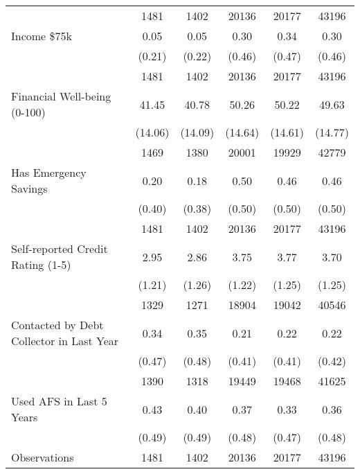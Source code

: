 {\begin{tabular}{l*{5}{c}}
                    &        1481&        1402&       20136&       20177&       43196\\
Income \>\$75k       &        0.05&        0.05&        0.30&        0.34&        0.30\\
                    &      (0.21)&      (0.22)&      (0.46)&      (0.47)&      (0.46)\\
                    &        1481&        1402&       20136&       20177&       43196\\
Financial Well-being (0-100)&       41.45&       40.78&       50.26&       50.22&       49.63\\
                    &     (14.06)&     (14.09)&     (14.64)&     (14.61)&     (14.77)\\
                    &        1469&        1380&       20001&       19929&       42779\\
Has Emergency Savings&        0.20&        0.18&        0.50&        0.46&        0.46\\
                    &      (0.40)&      (0.38)&      (0.50)&      (0.50)&      (0.50)\\
                    &        1481&        1402&       20136&       20177&       43196\\
Self-reported Credit Rating (1-5)&        2.95&        2.86&        3.75&        3.77&        3.70\\
                    &      (1.21)&      (1.26)&      (1.22)&      (1.25)&      (1.25)\\
                    &        1329&        1271&       18904&       19042&       40546\\
Contacted by Debt Collector in Last Year&        0.34&        0.35&        0.21&        0.22&        0.22\\
                    &      (0.47)&      (0.48)&      (0.41)&      (0.41)&      (0.42)\\
                    &        1390&        1318&       19449&       19468&       41625\\
Used AFS in Last 5 Years&        0.43&        0.40&        0.37&        0.33&        0.36\\
                    &      (0.49)&      (0.49)&      (0.48)&      (0.47)&      (0.48)\\
Observations                    &        1481&        1402&       20136&       20177&       43196\\

\hline\hline
\end{tabular}
}
